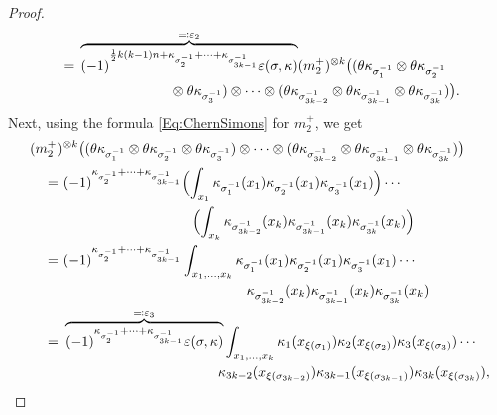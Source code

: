 \documentclass[\MainFolder/Text.tex]{subfiles}
\begin{document}
\begin{proof}
\begin{align*}
 &\quad = \begin{multlined}[t]\overbrace{(-1)^{\frac{1}{2} k(k-1) n  + \kappa_{\sigma^{-1}_{2}} + \dotsb + \kappa_{\sigma^{-1}_{3k-1}}} \varepsilon(\sigma,\kappa)}^{\eqqcolon\varepsilon_2} (m_2^+)^{\otimes k} \bigl((\SuspU \kappa_{\sigma^{-1}_1} \otimes \SuspU \kappa_{\sigma^{-1}_2} \\ \otimes \SuspU \kappa_{\sigma^{-1}_3}) \otimes \dotsb \otimes (\SuspU \kappa_{\sigma^{-1}_{3k-2}} \otimes \SuspU \kappa_{\sigma^{-1}_{3k-1}} \otimes \SuspU \kappa_{\sigma^{-1}_{3k}})\bigr). \end{multlined}
\end{align*}
Next, using the formula \eqref{Eq:ChernSimons} for $m_2^+$, we get
\begin{align*}
&(m_2^+)^{\otimes k}\bigl((\SuspU \kappa_{\sigma^{-1}_{1}} \otimes \SuspU \kappa_{\sigma^{-1}_{2}} \otimes \SuspU \kappa_{\sigma^{-1}_{3}}) \otimes \dotsb \otimes (\SuspU \kappa_{\sigma^{-1}_{3k-2}} \otimes \SuspU \kappa_{\sigma^{-1}_{3k-1}} \otimes \SuspU \kappa_{\sigma^{-1}_{3k}})\bigr) \\
&\quad= \begin{multlined}[t](-1)^{\kappa_{\sigma^{-1}_{2}} + \dotsb + \kappa_{\sigma^{-1}_{3k-1}}} \Bigl(\int_{x_1} \kappa_{\sigma^{-1}_{1}}(x_1)\kappa_{\sigma^{-1}_{2}}(x_1)\kappa_{\sigma^{-1}_{3}}(x_1) \Bigr) \dotsm \\ \Bigl(\int_{x_k} \kappa_{\sigma^{-1}_{3k-2}}(x_k)\kappa_{\sigma^{-1}_{3k-1}}(x_k) \kappa_{\sigma^{-1}_{3k}}(x_k) \Bigr)\end{multlined} \\
&\quad= \begin{multlined}[t](-1)^{\kappa_{\sigma^{-1}_{2}} + \dotsb + \kappa_{\sigma^{-1}_{3k-1}}} \int_{x_1,\dotsc,x_k} \kappa_{\sigma_{1}^{-1}}(x_1)\kappa_{\sigma_{2}^{-1}}(x_1)\kappa_{\sigma_{3}^{-1}}(x_1) \dotsm \\ \kappa_{\sigma_{3k-2}^{-1}}(x_k) \kappa_{\sigma_{3k-1}^{-1}}(x_k) \kappa_{\sigma_{3k}^{-1}}(x_k) \end{multlined}\\
&\quad = \begin{multlined}[t]\overbrace{(-1)^{\kappa_{\sigma^{-1}_{2}} + \dotsb + \kappa_{\sigma^{-1}_{3k-1}}} \varepsilon(\sigma,\kappa)}^{\eqqcolon\varepsilon_3} \int_{x_1,\dotsc,x_k} \kappa_{1}(x_{\xi(\sigma_{1})})\kappa_{2}(x_{\xi(\sigma_{2})}) \kappa_{3}(x_{\xi(\sigma_{3})}) \dotsm \\ \kappa_{3k-2}(x_{\xi(\sigma_{3k-2})}) \kappa_{3k-1}(x_{\xi(\sigma_{3k-1})})\kappa_{3k}(x_{\xi(\sigma_{3k})}), \end{multlined}

\end{align*}
\end{proof}
\end{document}
